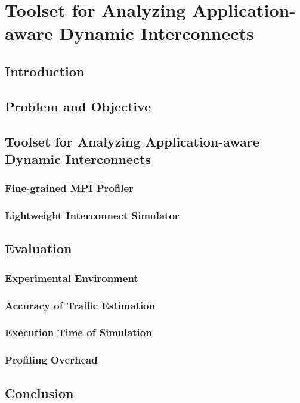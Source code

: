 \chapter{Toolset for Analyzing Application-aware Dynamic Interconnects}

\section{Introduction}

\section{Problem and Objective}

\section{Toolset for Analyzing Application-aware Dynamic Interconnects}

\subsection{Fine-grained MPI Profiler}

\subsection{Lightweight Interconnect Simulator}

\section{Evaluation}

\subsection{Experimental Environment}

\subsection{Accuracy of Traffic Estimation}

\subsection{Execution Time of Simulation}

\subsection{Profiling Overhead}

\section{Conclusion}
